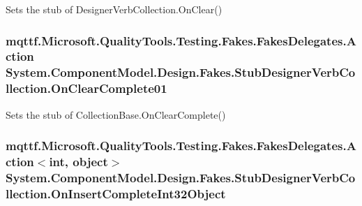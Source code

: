 Sets the stub of Designer\-Verb\-Collection.\-On\-Clear()

\hypertarget{class_system_1_1_component_model_1_1_design_1_1_fakes_1_1_stub_designer_verb_collection_a61fc8479092c6065daaaa944163703fe}{
\subsubsection[{On\-Clear\-Complete01}]{\setlength{\rightskip}{0pt plus 5cm}mqttf.\-Microsoft.\-Quality\-Tools.\-Testing.\-Fakes.\-Fakes\-Delegates.\-Action System.\-Component\-Model.\-Design.\-Fakes.\-Stub\-Designer\-Verb\-Collection.\-On\-Clear\-Complete01}}\label{class_system_1_1_component_model_1_1_design_1_1_fakes_1_1_stub_designer_verb_collection_a61fc8479092c6065daaaa944163703fe}


Sets the stub of Collection\-Base.\-On\-Clear\-Complete()

\hypertarget{class_system_1_1_component_model_1_1_design_1_1_fakes_1_1_stub_designer_verb_collection_aafc24149d90f1ac43d7a9de6c2f2b1f1}{
\subsubsection[{On\-Insert\-Complete\-Int32\-Object}]{\setlength{\rightskip}{0pt plus 5cm}mqttf.\-Microsoft.\-Quality\-Tools.\-Testing.\-Fakes.\-Fakes\-Delegates.\-Action$<$int, object$>$ System.\-Component\-Model.\-Design.\-Fakes.\-Stub\-Designer\-Verb\-Collection.\-On\-Insert\-Complete\-Int32\-Object}}\label{class_system_1_1_component_model_1_1_design_1_1_fakes_1_1_stub_designer_verb_collection_aafc24149d90f1ac43d7a9de6c2f2b1f1}


